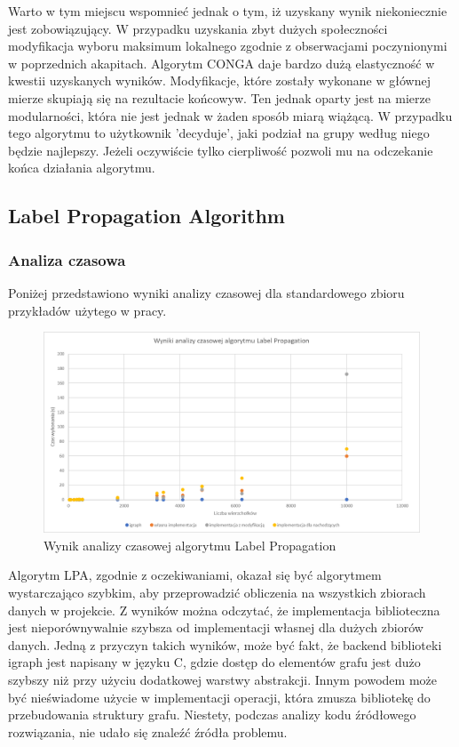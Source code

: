 \documentclass{article}
\begin{document}
Warto w tym miejscu wspomnieć jednak o tym, iż uzyskany wynik niekoniecznie jest zobowiązujący. W przypadku uzyskania zbyt dużych społeczności modyfikacja wyboru maksimum lokalnego zgodnie z obserwacjami poczynionymi w poprzednich akapitach. Algorytm CONGA daje bardzo dużą elastyczność w kwestii uzyskanych wyników. Modyfikacje, które zostały wykonane w głównej mierze skupiają się na rezultacie końcowyw. Ten jednak oparty jest na mierze modularności, która nie jest jednak w żaden sposób miarą wiążącą. W przypadku tego algorytmu to użytkownik 'decyduje', jaki podział na grupy według niego będzie najlepszy. Jeżeli oczywiście tylko cierpliwość pozwoli mu na odczekanie końca działania algorytmu.\\

\subsection{Label Propagation Algorithm}
\subsubsection{Analiza czasowa}
Poniżej przedstawiono wyniki analizy czasowej dla standardowego zbioru przykładów użytego w pracy.

\begin{figure}[H]
\centering
\includegraphics[width=\textwidth]{images/ms-lpa-benchmark.png}
\caption{Wynik analizy czasowej algorytmu Label Propagation}
\end{figure}

Algorytm LPA, zgodnie z oczekiwaniami, okazał się być algorytmem wystarczająco szybkim, aby przeprowadzić obliczenia na wszystkich zbiorach danych w projekcie. Z wyników można odczytać, że implementacja biblioteczna jest nieporównywalnie szybsza od implementacji własnej dla dużych zbiorów danych. Jedną z przyczyn takich wyników, może być fakt, że backend biblioteki igraph jest napisany w języku C, gdzie dostęp do elementów grafu jest dużo szybszy niż przy użyciu dodatkowej warstwy abstrakcji. Innym powodem może być nieświadome użycie w implementacji operacji, która zmusza bibliotekę do przebudowania struktury grafu. Niestety, podczas analizy kodu źródłowego rozwiązania, nie udało się znaleźć źródła problemu.\\
\end{document}
